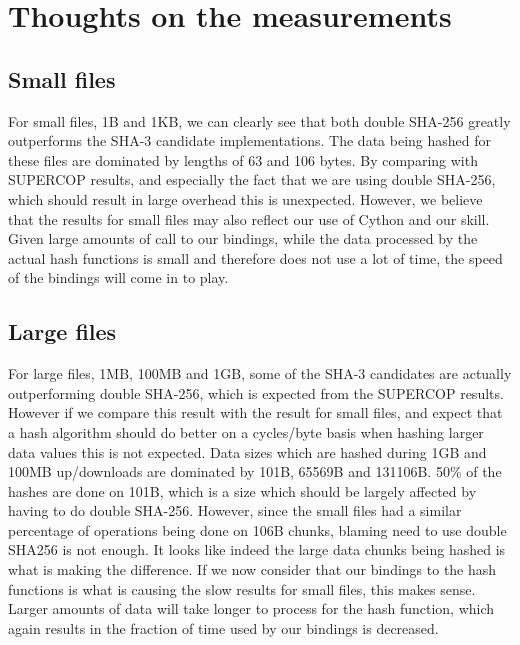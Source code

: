 \documentclass[english,12pt,a4paper]{book}
\begin{document}
\section{Thoughts on the measurements}

\subsection{Small files}

For small files, 1B and 1KB, we can clearly see that both double \ac{SHA}-256
greatly outperforms the \ac{SHA}-3 candidate implementations. The data being
hashed for these files are dominated by lengths of 63 and 106 bytes. By
comparing with \ac{SUPERCOP} results, and especially the fact that we are using
double \ac{SHA}-256, which should result in large overhead this is unexpected.
However, we believe that the results for small files may also reflect our use of
Cython and our skill. Given large amounts of call to our bindings, while the
data processed by the actual hash functions is small and therefore does not use
a lot of time, the speed of the bindings will come in to play.

\subsection{Large files}
For large files, 1MB, 100MB and 1GB, some of the \ac{SHA}-3 candidates are
actually outperforming double \ac{SHA}-256, which is expected from the
\ac{SUPERCOP} results. However if we compare this result with the result for
small files, and expect that a hash algorithm should do better on a cycles/byte
basis when hashing larger data values this is not expected. Data sizes which
are hashed during 1GB and 100MB up/downloads are dominated by 101B, 65569B and
131106B. 50\% of the hashes are done on 101B, which is a size which should be
largely affected by having to do double SHA-256. However, since the small files
had a similar percentage of operations being done on 106B chunks, blaming need
to use double \ac{SHA}256 is not enough. It looks like indeed the large data
chunks being hashed is what is making the difference. If we now consider that
our bindings to the hash functions is what is causing the slow results for
small files, this makes sense. Larger amounts of data will take longer to
process for the hash function, which again results in the fraction of time used
by our bindings is decreased.
\end{document}
